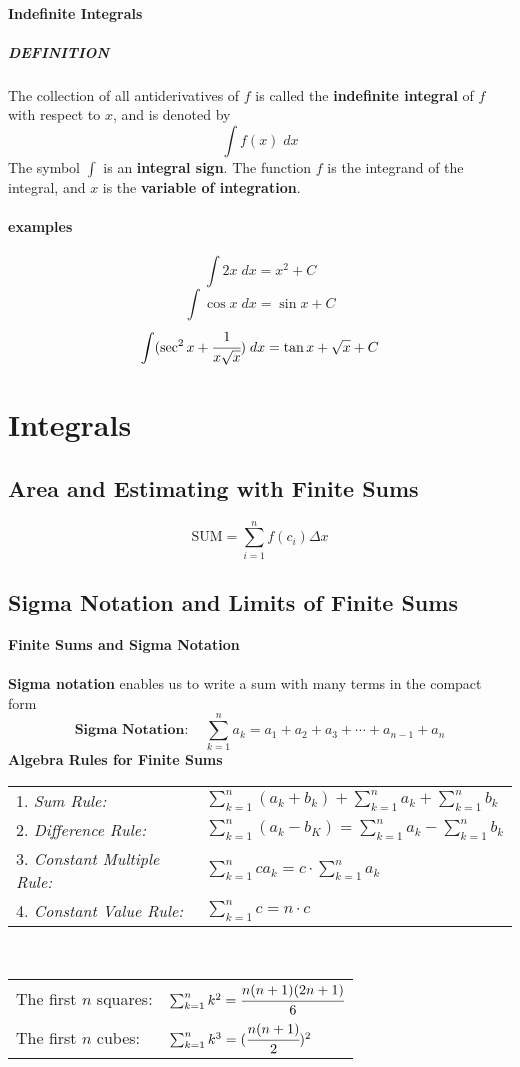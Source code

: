 \documentclass{article}
\begin{document}
            \paragraph{Indefinite Integrals}
                \subparagraph{DEFINITION} The collection of all antiderivatives of $f$ is called the \textbf{indefinite integral} of $f$ with respect to $x$, and is denoted by
                \[\int f(x)\; dx\]
                The symbol $\int$ is an \textbf{integral sign}. The function $f$ is the integrand of the integral, and $x$ is the \textbf{variable of integration}.
            \paragraph{examples}
            \[\int 2x\; dx=x^2+C\]
            \[\int \cos x \; dx=\sin x+C\]
            \[\int (\sec ^2 x+\cfrac{1}{x\sqrt{x}})\; dx=\tan x+\sqrt{x}+C\]

    \newpage
    \section{Integrals}
        \subsection{Area and Estimating with Finite Sums}
            \[\text{SUM}=\sum_{i=1}^{n}f(c_{i})\Delta x\]
        \subsection{Sigma Notation and Limits of Finite Sums}
            \textbf{Finite Sums and Sigma Notation}\\\\
            \textbf{Sigma notation} enables us to write a sum with many terms in the compact form
            \[\textbf{Sigma Notation}:\quad\sum_{k=1}^{n}a_{k}=a_1+a_2+a_3+\cdots +a_{n-1}+a_{n}\]
            \textbf{Algebra Rules for Finite Sums}\\
            \begin{tabular}{|ll|}
                \hline
                1. \textit{Sum Rule:}&$\sum_{k=1}^{n}(a_k+b_k)+\sum_{k=1}^{n}a_k+\sum_{k=1}^{n}b_k$\\
                2. \textit{Difference Rule:}&$\sum_{k=1}^n(a_k-b_K)=\sum_{k=1}^{n}a_k-\sum_{k=1}^{n}b_k$\\
                3. \textit{Constant Multiple Rule:}&$\sum_{k=1}^{n}ca_k=c\cdot \sum_{k=1}^{n}a_k$\\
                4. \textit{Constant Value Rule:}&$\sum_{k=1}^{n}c=n\cdot c$\\
                \hline
            \end{tabular}
            \\
            \begin{tabular}{|ll|}
                \hline
                The first $n$ squares:&$\sum_{k=1}^{n}k^2=\cfrac{n(n+1)(2n+1)}{6}$\\
                The first $n$ cubes:&$\sum_{k=1}^{n}k^3=(\cfrac{n(n+1)}{2})^2$\\
                \hline
            \end{tabular}
\end{document}

